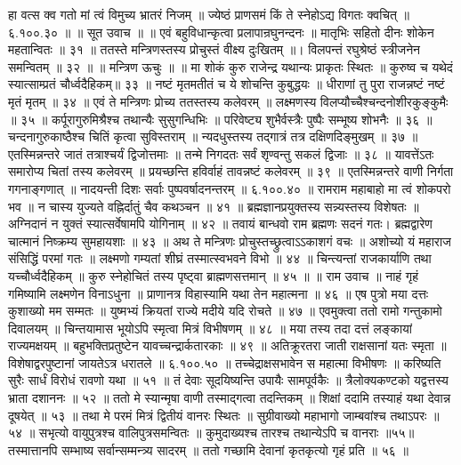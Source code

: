 हा वत्स क्व गतो मां त्वं विमुच्य भ्रातरं निजम् ॥
ज्येष्ठं प्राणसमं किं ते स्नेहोऽद्य विगतः क्वचित् ॥ ६.१००.३० ॥
॥ सूत उवाच ॥ ॥
एवं बहुविधान्कृत्वा प्रलापान्रघुनन्दनः ॥
मातृभिः सहितो दीनः शोकेन महतान्वितः ॥ ३१ ॥
ततस्ते मन्त्रिणस्तस्य प्रोचुस्तं वीक्ष्य दुःखितम् ॥।
विलपन्तं रघुश्रेष्ठं स्त्रीजनेन समन्वितम् ॥ ३२ ॥
॥ मन्त्रिण ऊचुः ॥ ॥
मा शोकं कुरु राजेन्द्र यथान्यः प्राकृतः स्थितः ॥
कुरुष्व च यथेदं स्यात्साम्प्रतं चौर्ध्वदैहिकम्॥ ३३ ॥
नष्टं मृतमतीतं च ये शोचन्ति कुबुद्धयः ॥
धीराणां तु पुरा राजन्नष्टं नष्टं मृतं मृतम् ॥ ३४ ॥
एवं ते मन्त्रिणः प्रोच्य ततस्तस्य कलेवरम् ॥
लक्ष्मणस्य विलप्यौच्चैश्चन्दनोशीरकुङ्कुमैः ॥ ३५ ॥
कर्पूरागुरुमिश्रैश्च तथान्यैः सुसुगन्धिभिः ॥
परिवेष्ट्य शुभैर्वस्त्रैः पुष्पैः सम्भूष्य शोभनैः ॥ ३६ ॥
चन्दनागुरुकाष्ठैश्च चितिं कृत्वा सुविस्तराम् ॥
न्यदधुस्तस्य तद्गात्रं तत्र दक्षिणदिङ्मुखम् ॥ ३७ ॥
एतस्मिन्नन्तरे जातं तत्राश्चर्यं द्विजोत्तमाः ॥
तन्मे निगदतः सर्वं शृण्वन्तु सकलं द्विजाः ॥ ३८ ॥
यावत्तेंऽतः समारोप्य चितां तस्य कलेवरम् ॥
प्रयच्छन्ति हविर्वाहं तावन्नष्टं कलेवरम् ॥ ३९ ॥
एतस्मिन्नन्तरे वाणी निर्गता गगनाङ्गणात् ॥
नादयन्ती दिशः सर्वाः पुष्पवर्षादनन्तरम् ॥ ६.१००.४० ॥
रामराम महाबाहो मा त्वं शोकपरो भव ॥
न चास्य युज्यते वह्निर्दातुं चैव कथञ्चन ॥ ४१ ॥
ब्रह्मज्ञानप्रयुक्तस्य सन्न्यस्तस्य विशेषतः ॥
अग्निदानं न युक्तं स्यात्सर्वेषामपि योगिनाम् ॥ ४२ ॥
तवायं बान्धवो राम ब्रह्मणः सदनं गतः।
ब्रह्मद्वारेण चात्मानं निष्क्रम्य सुमहायशाः ॥ ४३ ॥
अथ ते मन्त्रिणः प्रोचुस्तच्छ्रुत्वाऽऽकाशगं वचः ॥
अशोच्यो यं महाराज संसिद्धिं परमां गतः ॥
लक्ष्मणो गम्यतां शीघ्रं तस्मात्स्वभवने विभो ॥ ४४ ॥
चिन्त्यन्तां राजकार्याणि तथा यच्चौर्ध्वदैहिकम् ॥
कुरु स्नेहोचितं तस्य पृष्ट्वा ब्राह्मणसत्तमान् ॥ ४५ ॥
॥ राम उवाच ॥
नाहं गृहं गमिष्यामि लक्ष्मणेन विनाऽधुना ॥
प्राणानत्र विहास्यामि यथा तेन महात्मना ॥ ४६ ॥
एष पुत्रो मया दत्तः कुशाख्यो मम सम्मतः ॥
युष्मभ्यं क्रियतां राज्ये मदीये यदि रोचते ॥ ४७ ॥
एवमुक्त्वा ततो रामो गन्तुकामो दिवालयम् ॥
चिन्तयामास भूयोऽपि स्मृत्वा मित्रं विभीषणम् ॥ ४८ ॥
मया तस्य तदा दत्तं लङ्कायां राज्यमक्षयम् ॥
बहुभक्तिप्रतुष्टेन यावच्चन्द्रार्कतारकाः ॥ ४९ ॥
अतिक्रूरतरा जाती राक्षसानां यतः स्मृता ॥
विशेषाद्वरपुष्टानां जायतेऽत्र धरातले ॥ ६.१००.५० ॥
तच्चेद्राक्षसभावेन स महात्मा विभीषणः ॥
करिष्यति सुरैः सार्धं विरोधं रावणो यथा ॥ ५१ ॥
तं देवाः सूदयिष्यन्ति उपायैः सामपूर्वकैः ॥
त्रैलोक्यकण्टको यद्वत्तस्य भ्राता दशाननः ॥ ५२ ॥
ततो मे स्यान्मृषा वाणी तस्माद्गत्वा तदन्तिकम् ॥
शिक्षां ददामि तस्याहं यथा देवान्न दूषयेत् ॥ ५३ ॥
तथा मे परमं मित्रं द्वितीयं वानरः स्थितः ॥
सुग्रीवाख्यो महाभागो जाम्बवांश्च तथाऽपरः ॥ ५४ ॥
सभृत्यो वायुपुत्रश्च वालिपुत्रसमन्वितः ॥
कुमुदाख्यश्च तारश्च तथान्येऽपि च वानराः ॥५५॥
तस्मात्तानपि सम्भाष्य सर्वान्सम्मन्त्र्य सादरम् ॥
ततो गच्छामि देवानां कृतकृत्यो गृहं प्रति ॥ ५६ ॥
